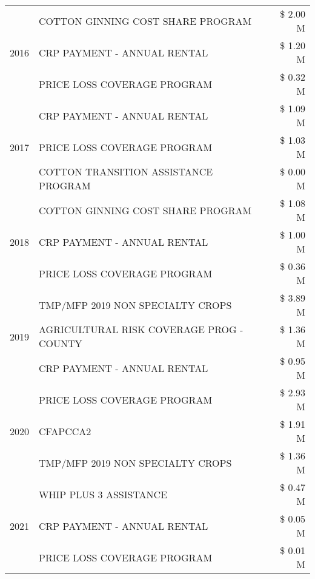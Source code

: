 \begin{tabular}{llr}
\cline{1-3}
\multirow[t]{3}{*}{2016} & COTTON GINNING COST SHARE PROGRAM & \$ 2.00 M \\
 & CRP PAYMENT - ANNUAL RENTAL & \$ 1.20 M \\
 & PRICE LOSS COVERAGE PROGRAM & \$ 0.32 M \\
\cline{1-3}
\multirow[t]{3}{*}{2017} & CRP PAYMENT - ANNUAL RENTAL & \$ 1.09 M \\
 & PRICE LOSS COVERAGE PROGRAM & \$ 1.03 M \\
 & COTTON TRANSITION ASSISTANCE PROGRAM & \$ 0.00 M \\
\cline{1-3}
\multirow[t]{3}{*}{2018} & COTTON GINNING COST SHARE PROGRAM & \$ 1.08 M \\
 & CRP PAYMENT - ANNUAL RENTAL & \$ 1.00 M \\
 & PRICE LOSS COVERAGE PROGRAM & \$ 0.36 M \\
\cline{1-3}
\multirow[t]{3}{*}{2019} & TMP/MFP 2019 NON SPECIALTY CROPS & \$ 3.89 M \\
 & AGRICULTURAL RISK COVERAGE PROG - COUNTY & \$ 1.36 M \\
 & CRP PAYMENT - ANNUAL RENTAL & \$ 0.95 M \\
\cline{1-3}
\multirow[t]{3}{*}{2020} & PRICE LOSS COVERAGE PROGRAM & \$ 2.93 M \\
 & CFAPCCA2 & \$ 1.91 M \\
 & TMP/MFP 2019 NON SPECIALTY CROPS & \$ 1.36 M \\
\cline{1-3}
\multirow[t]{3}{*}{2021} & WHIP PLUS 3 ASSISTANCE & \$ 0.47 M \\
 & CRP PAYMENT - ANNUAL RENTAL & \$ 0.05 M \\
 & PRICE LOSS COVERAGE PROGRAM & \$ 0.01 M \\
\cline{1-3}
\bottomrule
\end{tabular}

